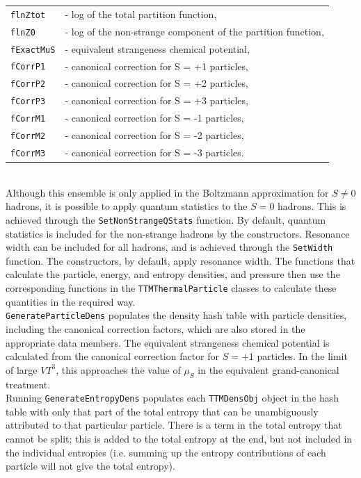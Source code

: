 \documentclass{elsarticle}
\begin{document}
\begin{tabular}{ll}
\texttt{flnZtot}   &- log of the total partition function,\\
\texttt{flnZ0}     &- log of the non-strange component of the partition function,\\
\texttt{fExactMuS} &- equivalent strangeness chemical potential,\\
\texttt{fCorrP1}   &- canonical correction for S = +1 particles,\\
\texttt{fCorrP2}   &- canonical correction for S = +2 particles,\\
\texttt{fCorrP3}   &- canonical correction for S = +3 particles,\\
\texttt{fCorrM1}   &- canonical correction for S = -1 particles,\\
\texttt{fCorrM2}   &- canonical correction for S = -2 particles,\\
\texttt{fCorrM3}   &- canonical correction for S = -3 particles.
\end{tabular}\\

Although this ensemble is only applied in the Boltzmann approximation for $S\neq0$ hadrons, it is 
possible to apply quantum statistics to the $S=0$ hadrons. This is achieved through the 
\texttt{SetNonStrangeQStats} function. By default, quantum statistics is included for the 
non-strange hadrons by the constructors. Resonance width can be included for all hadrons, 
and is achieved through the \texttt{SetWidth} function. The constructors, by default, apply 
resonance width. The functions that calculate the particle, energy, and entropy densities, and 
pressure then use the corresponding functions in the \texttt{TTMThermalParticle} classes to calculate 
these quantities in the required way.\\ 

\texttt{GenerateParticleDens} populates the density hash table with particle densities, including 
the canonical correction factors, which are also stored in the appropriate data members. The 
equivalent strangeness chemical potential is calculated from the canonical
correction factor for $S=+1$ particles. In the limit of large $VT^3$, 
this approaches the value of $\mu_S$ in the equivalent grand-canonical treatment.\\

Running \texttt{GenerateEntropyDens} populates each \texttt{TTMDensObj} object in the hash table 
with only that part of the total entropy that can be unambiguously attributed to that particular 
particle. There is a term in the total entropy that cannot be split; this 
is added to the total entropy at the end, but not included in the individual entropies (i.e. summing up 
the entropy contributions of each particle will not give the total entropy).\\
\end{document}
